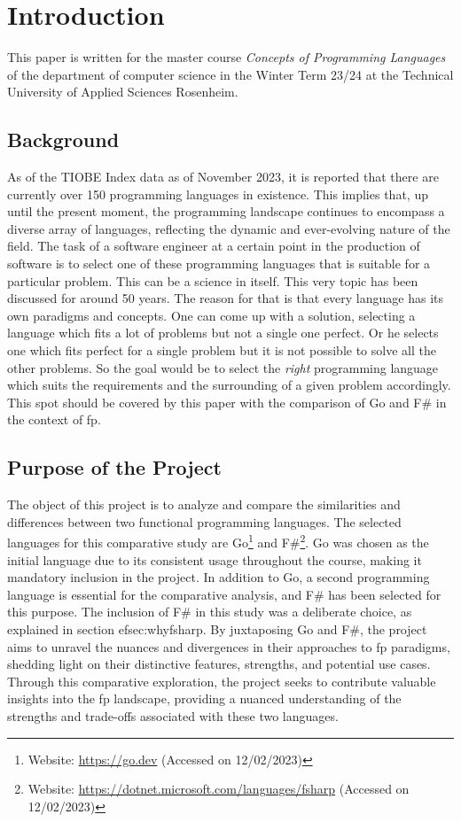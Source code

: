 \chapter{Introduction}\label{chap:introduction}
This paper is written for the master course \textit{Concepts of Programming Languages} of the department of computer science in the Winter Term 23/24 at the Technical University of Applied Sciences Rosenheim.
    \section{Background}\label{sec:background}
As of the TIOBE Index data as of November 2023, it is reported that there are currently over 150 programming languages in existence. This implies that, up until the present moment, the programming landscape continues to encompass a diverse array of languages, reflecting the dynamic and ever-evolving nature of the field.\cite{tiobeindex} The task of a software engineer at a certain point in the production of software is to select one of these programming languages that is suitable for a particular problem. This can be a science in itself. This very topic has been discussed for around 50 years.\cite{Tharp1982}
The reason for that is that every language has its own paradigms and concepts. One can come up with a solution, selecting a language which fits a lot of problems but not a single one perfect. Or he selects one which fits perfect for a single problem but it is not possible to solve all the other problems.
So the goal would be to select the \textit{right} programming language which suits the requirements and the surrounding of a given problem accordingly.
This spot should be covered by this paper with the comparison of Go and F\# in the context of \ac{fp}.

    \section{Purpose of the Project}\label{sec:purpose}
    The object of this project is to analyze and compare the similarities and differences between two functional programming languages. The selected languages for this comparative study are Go\footnote{Website: \url{https://go.dev} (Accessed on 12/02/2023)} and F\#\footnote{Website: \url{https://dotnet.microsoft.com/languages/fsharp} (Accessed on 12/02/2023)}. Go was chosen as the initial language due to its consistent usage throughout the course, making it mandatory inclusion in the project. 
    In addition to Go, a second programming language is essential for the comparative analysis, and F\# has been selected for this purpose. The inclusion of F\# in this study was a deliberate choice, as explained in section 
    ef{sec:whyfsharp}. By juxtaposing Go and F\#, the project aims to unravel the nuances and divergences in their approaches to \ac{fp} paradigms, shedding light on their distinctive features, strengths, and potential use cases. Through this comparative exploration, the project seeks to contribute valuable insights into the \ac{fp} landscape, providing a nuanced understanding of the strengths and trade-offs associated with these two languages.

